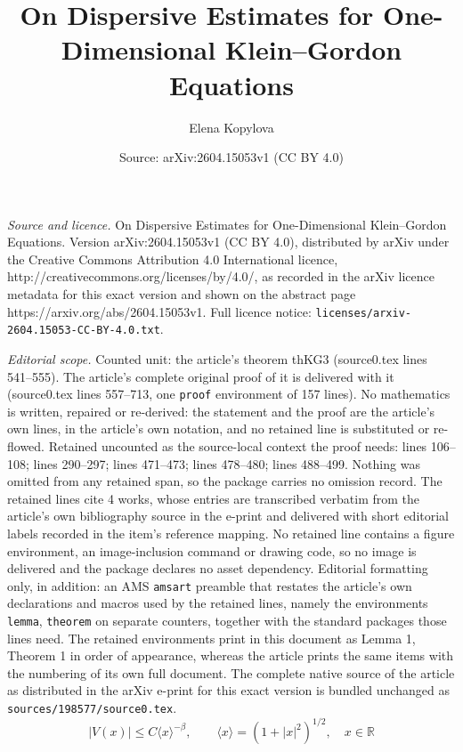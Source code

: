 \documentclass[10pt,a4paper]{amsart}
\title{On Dispersive Estimates for One-Dimensional Klein--Gordon Equations}
\author{Elena Kopylova}
\date{Source: arXiv:2604.15053v1 (CC BY 4.0)}
\newcommand{\R}{{\mathbb R}}
\begin{document}
\maketitle

\noindent\emph{Source and licence.} On Dispersive Estimates for One-Dimensional Klein--Gordon Equations. Version arXiv:2604.15053v1 (CC BY 4.0), distributed by arXiv under the Creative Commons Attribution 4.0 International licence, http://creativecommons.org/licenses/by/4.0/, as recorded in the arXiv licence metadata for this exact version and shown on the abstract page https://arxiv.org/abs/2604.15053v1. Full licence notice: \texttt{licenses/arxiv-2604.15053-CC-BY-4.0.txt}.\par\smallskip

\noindent\textit{Editorial scope.} Counted unit: the article's theorem thKG3 (source0.tex lines 541--555). The article's complete original proof of it is delivered with it (source0.tex lines 557--713, one \texttt{proof} environment of 157 lines). No mathematics is written, repaired or re-derived: the statement and the proof are the article's own lines, in the article's own notation, and no retained line is substituted or re-flowed.  Retained uncounted as the source-local context the proof needs: lines 106--108; lines 290--297; lines 471--473; lines 478--480; lines 488--499.  Nothing was omitted from any retained span, so the package carries no omission record.  The retained lines cite 4 works, whose entries are transcribed verbatim from the article's own bibliography source in the e-print and delivered with short editorial labels recorded in the item's reference mapping.  No retained line contains a figure environment, an image-inclusion command or drawing code, so no image is delivered and the package declares no asset dependency.  Editorial formatting only, in addition: an AMS \texttt{amsart} preamble that restates the article's own declarations and macros used by the retained lines, namely the environments \texttt{lemma}, \texttt{theorem} on separate counters, together with the standard packages those lines need.  The retained environments print in this document as Lemma 1, Theorem 1 in order of appearance, whereas the article prints the same items with the numbering of its own full document.  The complete native source of the article as distributed in the arXiv e-print for this exact version is bundled unchanged as \texttt{sources/198577/source0.tex}.
\begin{equation}\label{V}
    |V(x)|\le C\langle x\rangle^{-\beta},\quad\quad \langle x\rangle=(1+|x|^2)^{1/2},\quad x\in\R
\end{equation}
\end{document}
